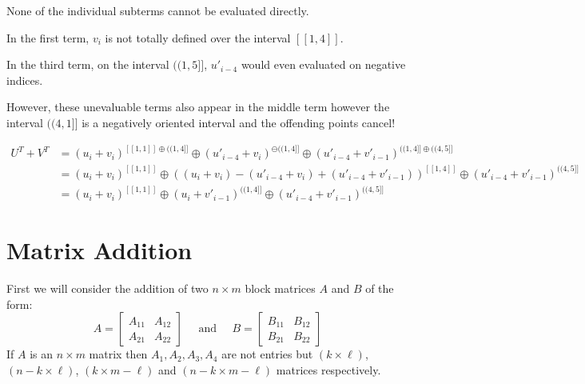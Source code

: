 None of the individual subterms cannot be evaluated directly.

In the first term, $v_i$ is not totally defined over the interval $[\![1,4]\!]$.

In the third term, on the interval $(\!(1,5]\!]$, $u'_{i-4}$ would even evaluated on negative indices.

However, these unevaluable terms also appear in the middle term however the interval $(\!(4,1]\!]$ is a negatively oriented interval and the offending points cancel!

\begin{align}
U^T + V^T &= (u_i + v_i)^{[\![1,1]\!] \oplus (\!(1,4]\!]} \oplus (u'_{i-4} + v_i)^{\ominus(\!(1,4]\!]} \oplus (u'_{i-4} + v'_{i-1})^{(\!(1,4]\!] \oplus (\!(4,5]\!]}\\
&= (u_i + v_i)^{[\![1,1]\!]} \oplus \left((u_i + v_i) - (u'_{i-4} + v_i) + (u'_{i-4} + v'_{i-1})\right)^{[\![1,4]\!]} \oplus (u'_{i-4} + v'_{i-1})^{(\!(4,5]\!]} \\ 
&= (u_i + v_i)^{[\![1,1]\!]} \oplus (u_i + v'_{i-1})^{(\!(1,4]\!]} \oplus (u'_{i-4} + v'_{i-1})^{(\!(4,5]\!]}
\end{align}

\section{Matrix Addition}


First we will consider the addition of two $n \times m$ block matrices $A$ and $B$ of the form:
\begin{equation}
	A = \left[ \begin{array}{cc} A_{11} & A_{12} \\ A_{21} & A_{22} \end{array} \right]
	\;\;\;\;\; \text{and} \;\;\;\;\;
	B = \left[ \begin{array}{cc} B_{11} & B_{12} \\ B_{21} & B_{22} \end{array} \right]
\end{equation}
If $A$ is an $n \times m$ matrix then $A_1, A_2, A_3, A_4$ are not entries but $(k \times \ell)$, $(n-k \times \ell)$, $(k \times m - \ell)$ and $(n-k \times m - \ell)$ matrices respectively.






%
